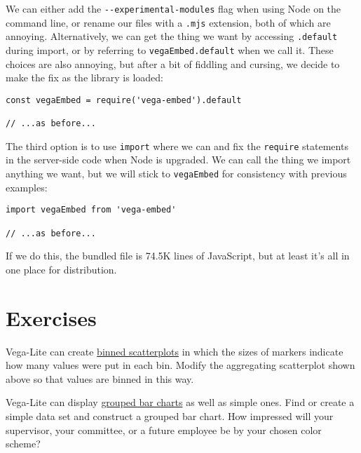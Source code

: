 We can either add the \texttt{-\/-experimental-modules} flag when using Node on the command line,
or rename our files with a \texttt{.mjs} extension,
both of which are annoying.
Alternatively,
we can get the thing we want by accessing \texttt{.default} during import,
or by referring to \texttt{vegaEmbed.default} when we call it.
These choices are also annoying,
but after a bit of fiddling and cursing,
we decide to make the fix as the library is loaded:

\begin{verbatim}
const vegaEmbed = require('vega-embed').default

// ...as before...
\end{verbatim}

The third option is to use \texttt{import} where we can
and fix the \texttt{require} statements in the server-side code when Node is upgraded.
We can call the thing we import anything we want,
but we will stick to \texttt{vegaEmbed} for consistency with previous examples:

\begin{verbatim}
import vegaEmbed from 'vega-embed'

// ...as before...
\end{verbatim}

\noindent
If we do this,
the bundled file is 74.5K lines of JavaScript,
but at least it's all in one place for distribution.

\section{Exercises}\label{s:vis-exercises}


Vega-Lite can create
\href{https://vega.github.io/vega-lite/examples/circle_binned.html}{binned scatterplots}
in which the sizes of markers indicate how many values were put in each bin.
Modify the aggregating scatterplot shown above
so that values are binned in this way.


Vega-Lite can display
\href{https://vega.github.io/vega-lite/examples/bar_grouped.html}{grouped bar charts}
as well as simple ones.
Find or create a simple data set and construct a grouped bar chart.
How impressed will your supervisor, your committee, or a future employee be
by your chosen color scheme?


